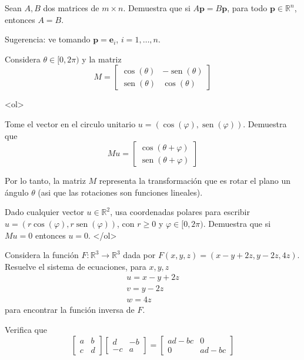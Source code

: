 \documentclass{article}
\theoremstyle{definition}
\newcommand{\sen}{\operatorname{sen}}
\begin{document}
	\item Sean $A,B$ dos matrices de $m \times n$. Demuestra que si $A\mathbf{p}=B\mathbf{p}$,
	para todo $\mathbf{p}\in \mathbb{R}^n$, entonces $A=B$. 
	
	Sugerencia: ve tomando $\mathbf{p}=\mathbf{e}_i$, $i=1,\dots, n$.



        
\item Considera $\theta\in [0, 2\pi)$ y la matriz 
$$
M=\left[
\begin{array}{cc}
\cos(\theta ) & -\sen(\theta) \\
\sen(\theta) & \cos(\theta)
\end{array}
\right]
$$

<ol>
\item Tome el vector en el circulo unitario $u=(\cos(\varphi), \sen(\varphi))$. Demuestra que
$$
Mu=\left[
\begin{array}{c}
\cos(\theta+\varphi) \\
\sen(\theta+\varphi)
\end{array}
\right]
$$


Por lo tanto, la matriz $M$ representa la transformación que es rotar el plano un ángulo $\theta$
(asi que las rotaciones son funciones lineales).

\item Dado cualquier vector $u\in \mathbb{R}^2$, usa coordenadas polares para escribir $u=(r\cos(\varphi), r\sen(\varphi))$, con $r\geq 0$ y $\varphi\in [0,2\pi)$. Demuestra que si $Mu=0$ entonces $u=0$.
</ol>


	
	\item Considera la función $F:\mathbb{R}^3\to  \mathbb{R}^3$ dada por
	$F(x,y,z)=(x-y+2z, y-2z, 4z)$. Resuelve el sistema de ecuaciones, para $x,y,z$
	$$
	\begin{array}{c}
	u=x-y+2z \\
	v=y-2z\\
	w=4z
	\end{array}
	$$
	para encontrar la función inversa de $F$.


        \item Verifica que 
	$$
	\left[
	\begin{array}{cc}
	a & b \\
	c & d
	\end{array}
	\right] 
	\left[
	\begin{array}{cc}
	d & -b \\
	-c & a
	\end{array}
	\right]=
	\left[
	\begin{array}{cc}
	ad-bc & 0 \\
	0 & ad-bc 
	\end{array}
	\right]
	$$
\end{document}
